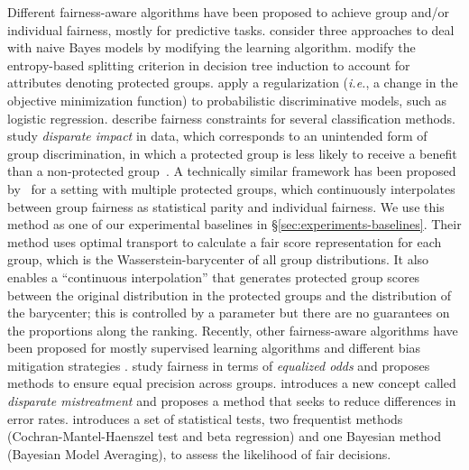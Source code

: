 Different fairness-aware algorithms have been proposed to achieve group and/or individual fairness, mostly for predictive tasks. \citet{Calders2010} consider three approaches to deal with naive Bayes models by modifying the learning algorithm.
\citet{CaldersICDM} modify the entropy-based splitting criterion in decision tree induction to account for attributes denoting protected groups.
\citet{Kamishima2012}  apply a regularization ({\em i.e.}, a
change in the objective minimization function) to probabilistic discriminative models, such
as logistic regression. \citet{zafar2015} describe fairness constraints for several classification methods.
%
\citet{Feldman2015} study \emph{disparate impact} in data, which corresponds to an unintended form of group discrimination, in which a protected group is less likely to receive a benefit than a non-protected group~\cite{Barocas2014}.
%
A technically similar framework has been proposed by~\citet{zehlike2020matching} for a setting with multiple protected groups, which continuously interpolates between group fairness as statistical parity and individual fairness.
%
We use this method as one of our experimental baselines in \S\ref{sec:experiments-baselines}.
%
Their method uses optimal transport to calculate a fair score representation for each group, which is the Wasserstein-barycenter of all group distributions.
%
It also enables a ``continuous interpolation'' that generates protected group scores between the original distribution in the protected groups and the distribution of the barycenter; this is controlled by a parameter but there are no guarantees on the proportions along the ranking.
%
Recently, other fairness-aware algorithms have been proposed for mostly supervised learning algorithms and different bias mitigation strategies \cite{hardt2016equality, jabbari2016fair, friedler2016possibility, celis2016fair, corbett2017algorithmic, mcnair2018preventing}.
%
\citet{hardt2016equality} study fairness in terms of \emph{equalized odds} and proposes methods to ensure equal precision across groups.
%
\citet{zafar2017fairness} introduces a new concept called \emph{disparate mistreatment} and proposes a method that seeks to reduce differences in error rates.
%
\citet{mcnair2018preventing} introduces a set of statistical tests, two frequentist methods (Cochran-Mantel-Haenszel test and beta regression) and one Bayesian method (Bayesian Model Averaging), to assess the likelihood of fair decisions.

